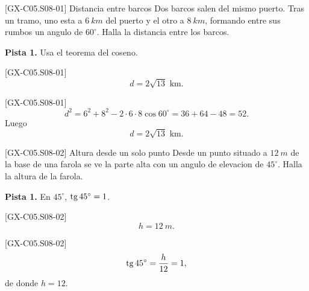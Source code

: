\begin{guidedexercise}{[GX-C05.S08-01] Distancia entre barcos}
Dos barcos salen del mismo puerto. Tras un tramo, uno esta a \(\SI{6}{km}\) del puerto y el
otro a \(\SI{8}{km}\), formando entre sus rumbos un angulo de \(60^\circ\). Halla la distancia
entre los barcos.

\textbf{Pista 1.} Usa el teorema del coseno.
\end{guidedexercise}

\begin{shortanswer}{[GX-C05.S08-01]}
\[
d=2\sqrt{13}\text{ km}.
\]
\end{shortanswer}

\begin{fullsolution}{[GX-C05.S08-01]}
\[
d^2=6^2+8^2-2\cdot 6\cdot 8\cos 60^\circ=36+64-48=52.
\]
Luego
\[
d=2\sqrt{13}\text{ km}.
\]
\end{fullsolution}

\begin{guidedexercise}{[GX-C05.S08-02] Altura desde un solo punto}
Desde un punto situado a \(\SI{12}{m}\) de la base de una farola se ve la parte alta con un
angulo de elevacion de \(45^\circ\). Halla la altura de la farola.

\textbf{Pista 1.} En \(45^\circ\), \(\operatorname{tg} 45^\circ=1\).
\end{guidedexercise}

\begin{shortanswer}{[GX-C05.S08-02]}
\[
h=\SI{12}{m}.
\]
\end{shortanswer}

\begin{fullsolution}{[GX-C05.S08-02]}
\[
\operatorname{tg} 45^\circ=\frac{h}{12}=1,
\]
de donde \(h=12\).
\end{fullsolution}

